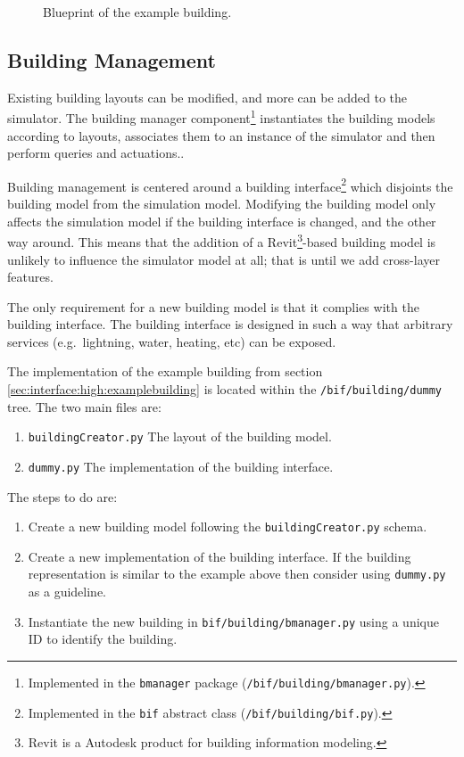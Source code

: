 \documentclass[10pt]{article}
\newcommand{\includeSVG}[1]{
  \texttt{[image: figs/\#1.pdf]}
}
\begin{document}
\begin{figure}[htbp]
  \begin{center}
    \rotatebox{0}{\scalebox{1.0}{\includeSVG{building0}}}
  \end{center}
  \caption{Blueprint of the example building.}
  \label{fig:building:example}
\end{figure}

\subsection{Building Management}

Existing building layouts can be modified, and more can be added to the simulator. The building manager component\footnote{Implemented in the \texttt{bmanager} package (\texttt{/bif/building/bmanager.py}).} instantiates the building models according to layouts, associates them to an instance of the simulator and then perform queries and actuations..

Building management is centered around a building interface\footnote{Implemented in the \texttt{bif} abstract class (\texttt{/bif/building/bif.py}).} which disjoints the building model from the simulation model. Modifying the building model only affects the simulation model if the building interface is changed, and the other way around. This means that the addition of a Revit\footnote{Revit is a Autodesk product for building information modeling.}-based building model is unlikely to influence the simulator model at all; that is until we add cross-layer features.

The only requirement for a new building model is that it complies with the building interface. The building interface is designed in such a way that arbitrary services (e.g.\ lightning, water, heating, etc) can be exposed.

The implementation of the example building from section \ref{sec:interface:high:examplebuilding} is located within the \texttt{/bif/building/dummy} tree. The two main files are:
\begin{enumerate}
  \item \texttt{buildingCreator.py} The layout of the building model.
  \item \texttt{dummy.py} The implementation of the building interface.
\end{enumerate}

The steps to do are:
\begin{enumerate}
\item Create a new building model following the \texttt{buildingCreator.py} schema.
\item Create a new implementation of the building interface. If the building representation is similar to the example above then consider using \texttt{dummy.py} as a guideline.
\item Instantiate the new building in \texttt{bif/building/bmanager.py} using a unique ID to identify the building.
\end{enumerate}
\end{document}

